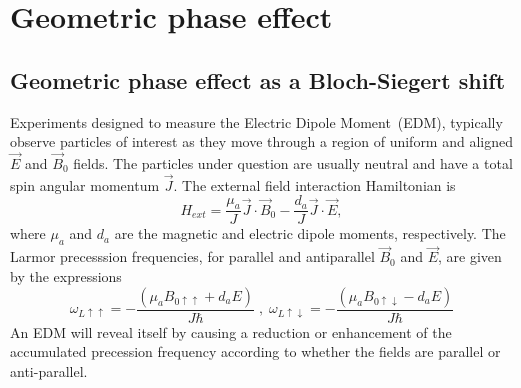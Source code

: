 \chapter{Geometric phase effect\label{app:GPE}~\cite{NMR_Notes}}

\section{Geometric phase effect as a Bloch-Siegert shift}

Experiments designed to measure the Electric Dipole Moment~(EDM),
typically observe particles of interest as they move through a region
of uniform and aligned $\vec{E}$ and $\vec{B}_0$ fields. The
particles under question are usually neutral and have a total spin
angular momentum $\vec{J}$. The external field interaction
Hamiltonian is
%
\begin{equation}
H_{ext} = \frac{\mu_a}{J}\vec{J}\cdot\vec{B}_0 - \frac{d_a}{J}\vec{J}\cdot\vec{E},
\end{equation}
%
where $\mu_a$ and $d_a$ are the magnetic and electric dipole moments,
respectively.
The Larmor precesssion frequencies, for parallel and antiparallel
$\vec{B}_0$ and $\vec{E}$, are given by the expressions
%
\begin{equation}
\label{eqn:GPEw}
\omega_{L\uparrow\uparrow} = -\frac{(\mu_a B_{0\uparrow\uparrow} + d_a E)}{J\hbar} \; , \; \omega_{L\uparrow\downarrow} = -\frac{(\mu_a B_{0\uparrow\downarrow} - d_a E)}{J\hbar} 
\end{equation}
%
An EDM will reveal itself by causing a reduction or enhancement of the
accumulated precession frequency according to whether the fields are
parallel or anti-parallel.

